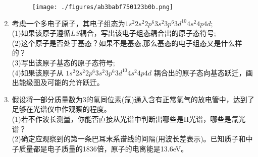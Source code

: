 \begin{enumerate}
\begin{figure}[ht]
\centering
\texttt{[image: ./figures/ab3babf750123b0b.png]}
\caption{} \label{fig_ZKD14_4}
\end{figure}
\item 考虑一个多电子原子，其电子组态为$1s^2 2s^2 2p^6 3s^2 3p^6 3d^{10}4s^2 4p4d$;\\
(1)如果该原子遵循$LS$耦合，写出该电子组态耦合出的原子态符号;\\
(2)这个原子是否处于基态？如果不是基态,那么基态的电子组态又是什么样的？\\
(3)写出该原子基态的原子态符号;\\
(4)如果该原子从 $1s^2 2s^2 2p^6 3s^2 3p^6 3d^{10}4s^2 4p4d$ 耦合出的原子态向基态跃迁，画出能级图及可能的允许跃迁。
\item 假设将一部分质量数为3的氢同位素(氚)通入含有正常氢气的放电管中，达到了足够在光谱仪中作观察的程度。\\
(1)若不作波长测量，你能否直接从光谱中判断出哪些是H光谱，哪些是氚光谱？\\
(2)确定应观察到的第一条巴耳末系谱线的间隔(用波长差表示)。已知质子和中子质量都是电子质量的1836倍，原子的电离能是13.6eV。
\end{enumerate}
